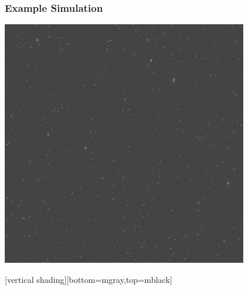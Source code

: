 \documentclass{beamer}
\begin{document}
{

    \frame
    {
        \frametitle{Example Simulation}
     
        \begin{center}
            \includegraphics[width=0.8\textwidth]{nbrsim-003e-000023-image.jpg}
            \newline
        \end{center}

    }
    [vertical shading][bottom=mgray,top=mblack]

}
\end{document}
